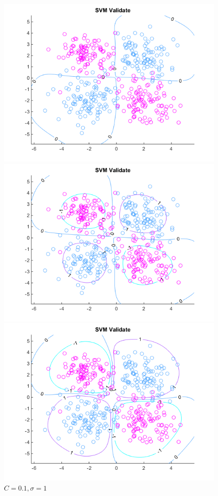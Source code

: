 \documentclass[10pt,letterpaper]{article}
\begin{document}
\begin{center}
\begin{figure}[!htb]
  \includegraphics[width=\linewidth]{figures/C,01sigma1.png}
  \caption{$C = 0.01, \sigma = 1$}\label{fig:c01}
\endminipage\hfill
{}
  \includegraphics[width=\linewidth]{figures/C,1sigma1.png}
  \caption{$C = 0.1, \sigma = 1$}
\endminipage\hfill
{}
  \includegraphics[width=\linewidth]{figures/C1sigma1.png}

\end{figure}
\end{center}
\end{document}
